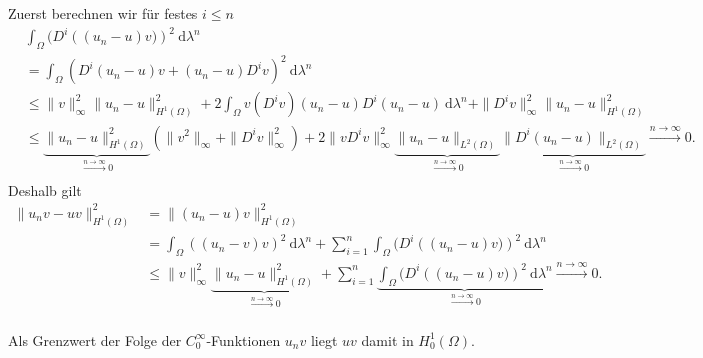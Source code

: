 \begin{solution}
\begin{itemize}
Zuerst berechnen wir für festes $i \leq n$
\begin{align*}
    &\int_\Omega (D^i\left((u_n-u) v)\right)^2 \mathrm{~d}\lambda^n\\
    &= \int_{\Omega} (D^i(u_n-u)v + (u_n-u)D^iv)^2 \mathrm{~d}\lambda^n\\
    &\leq \|v\|^2_\infty \|u_n - u\|^2_{H^1(\Omega)} + 2 \int_{\Omega} v (D^iv) (u_n-u) D^i(u_n - u) \mathrm{~d}\lambda^n + \|D^iv\|^2_\infty \|u_n - u\|^2_{H^1(\Omega)}\\
    &\leq \underbrace{\|u_n - u\|^2_{H^1(\Omega)}}_{\xrightarrow[]{n \rightarrow \infty}{} 0} \left(\|v^2\|_\infty + \|D^iv\|^2_\infty\right) + 2\|vD^iv\|^2_\infty \underbrace{\|u_n-u\|_{L^2(\Omega)}}_{\xrightarrow[]{n \rightarrow \infty}{} 0} \underbrace{\|D^i(u_n-u)\|_{L^2(\Omega)}}_{\xrightarrow[]{n \rightarrow \infty}{} 0} \xrightarrow[]{n \rightarrow \infty}{} 0.
\end{align*}
Deshalb gilt
\begin{align*}
    \| u_n v - uv \|^2_{H^1(\Omega)}
    &= \| (u_n-u) v\|^2_{H^1(\Omega)}\\
    &= \int_\Omega((u_n-v) v)^2 \mathrm{~d}\lambda^n
    + \sum_{i = 1}^n \int_\Omega (D^i\left((u_n-u) v)\right)^2 \mathrm{~d}\lambda^n\\
    &\leq \|v\|^2_\infty \underbrace{\|u_n - u\|^2_{H^1(\Omega)}}_{\xrightarrow[]{n \rightarrow \infty}{} 0} + \sum_{i = 1}^n \underbrace{\int_{\Omega} (D^i\left((u_n-u) v)\right)^2 \mathrm{~d}\lambda^n}_{\xrightarrow[]{n \rightarrow \infty}{} 0} \xrightarrow[]{n \rightarrow \infty}{} 0.
\end{align*}

Als Grenzwert der Folge der $C_0^\infty$-Funktionen $u_n v$ liegt $uv$ damit in $H_0^1(\Omega).$
\end{itemize}

\end{solution}

